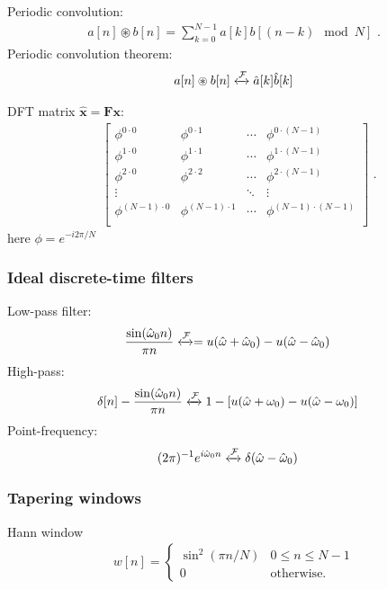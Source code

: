 \documentclass[6pt,landscape,a4paper]{article}
\begin{document}
\begin{multicols*}{5}
Periodic convolution:
\begin{align*}
  a[n] \circledast b[n] = \textstyle\sum_{k=0}^{N-1} a[k]b[(n-k) \mod N] \,\,.
\end{align*}
Periodic convolution theorem:
\begin{align*}
    a[n] \circledast b[n] \xleftrightarrow{\mathcal{F}} \hat{a}[k]\hat{b}[k]
\end{align*}

DFT matrix $\bm{\hat{x}}=\bm{F}\bm{x}$:
\begin{align*}
&\begin{bmatrix}
                               \phi^{0\cdot0}     & \phi^{0 \cdot 1}         & \cdots & \phi^{0 \cdot (N-1)}     \\
                               \phi^{1\cdot0}     & \phi^{1 \cdot 1}        & \cdots & \phi^{1 \cdot (N-1)}     \\
                               \phi^{2\cdot0}      & \phi^{2 \cdot 2}     & \cdots & \phi^{2 \cdot (N-1)}     \\
                               \vdots             &                      &                       \ddots & \vdots                   \\
                               \phi^{(N-1)\cdot0} & \phi^{(N-1) \cdot 1}  & \cdots & \phi^{(N-1) \cdot (N-1)} \\
                             \end{bmatrix} \,\,.
\end{align*}
here $\phi=e^{-i 2\pi/N}$
\subsubsection*{Ideal discrete-time filters}
Low-pass filter:
\begin{align*}
    \frac{\sin(\hat{\omega}_0 n)}{\pi n}  &\xleftrightarrow{\mathcal{F}}  = u(\hat{\omega}+\hat{\omega}_0)-u(\hat{\omega}-\hat{\omega}_0)
\end{align*}
High-pass:
\begin{align*}
\delta[n] - \frac{\sin(\hat{\omega}_0 n)}{\pi n} &\xleftrightarrow{\mathcal{F}}  1-[u(\hat{\omega}+\omega_0)-u(\hat{\omega}-\omega_0)] 
\end{align*}
Point-frequency:
\begin{align*}
    (2\pi)^{-1} e^{i\hat{\omega}_0 n} &\xleftrightarrow{\mathcal{F}}  \delta(\hat{\omega}-\hat{\omega}_0)
\end{align*}
\subsubsection*{Tapering windows}
Hann window
\begin{align*}
  w[n] =\left\{ \begin{array}{cc}
    \sin^2(\pi n/N) & 0 \le n \le N-1     \\
    0               & \mathrm{otherwise}.
  \end{array}
  \right.
  \label{eq:hann_window_def}
\end{align*}

\end{multicols*}
\end{document}
